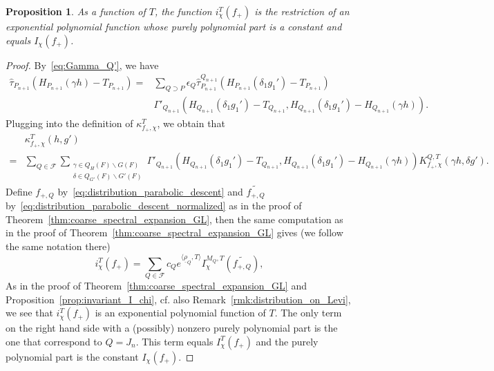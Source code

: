 \documentclass[letterpaper,11pt]{amsart}
\newcommand{\cF}{\mathcal{F}}
\newcommand{\<}{\negthickspace}
\theoremstyle{definition}
\theoremstyle{plain}
\newtheorem{prop}[definition]{Proposition}
\theoremstyle{remark}
\numberwithin{equation}{section}
\begin{document}
\begin{prop}    \label{prop:modified_kernel_second}
As a function of $T$, the function $i_{\chi}^T(f_+)$ is the restriction of
an exponential polynomial function whose purely polynomial part is a constant
and equals $I_\chi(f_+)$.
\end{prop}

\begin{proof}
By~\eqref{eq:Gamma_Q'}, we have
    \begin{align*}
     \widehat{\tau}_{P_{n+1}}(H_{P_{n+1}}(\gamma h)-T_{P_{n+1}})
     = &\sum_{Q \supset P} \epsilon_Q \widehat{\tau}_{P_{n+1}}^{Q_{n+1}}
     ( H_{P_{n+1}}(\delta_1 g_1')-T_{P_{n+1}} )\\
     &\Gamma'_{Q_{n+1}} ( H_{Q_{n+1}}(\delta_1 g_1')-T_{Q_{n+1}},
     H_{Q_{n+1}}(\delta_1 g_1') - H_{Q_{n+1}}(\gamma h) ).
    \end{align*}
Plugging into the definition of $\kappa_{f_+, \chi}^T$, we obtain that
    \[
    \begin{aligned}
    &\kappa_{f_+,\chi}^T(h,g')\\ = &\sum_{Q \in \cF}
    \sum_{ \substack{\gamma \in Q_H(F) \backslash G(F) \\
    \delta \in Q_{G'}(F) \backslash G'(F)}}
    \Gamma'_{Q_{n+1}}(H_{Q_{n+1}}(\delta_1 g_1')-T_{Q_{n+1}},
    H_{Q_{n+1}}(\delta_1 g_1')-H_{Q_{n+1}}(\gamma h))
    K_{f_+,\chi}^{Q,T}(\gamma h,\delta g').
    \end{aligned}
    \]
Define $f_{+, Q}$ by~\eqref{eq:distribution_parabolic_descent} and
$\widetilde{f_{+, Q}}$
by~\eqref{eq:distribution_parabolic_descent_normalized} as in the proof of
Theorem~\ref{thm:coarse_spectral_expansion_GL}, then the same computation as
in the proof of Theorem~\ref{thm:coarse_spectral_expansion_GL} gives (we
follow the same notation there)
    \[
    i_\chi^T(f_+) = \sum_{Q \in \cF}
    c_Q e^{\langle \underline{\rho}_Q, T \rangle}
    I_\chi^{M_Q,T}(\widetilde{f_{+, Q}}),
    \]
As in the proof of Theorem~\ref{thm:coarse_spectral_expansion_GL} and
Proposition~\ref{prop:invariant_I_chi}, cf. also
Remark~\ref{rmk:distribution_on_Levi},
we see that $i_\chi^T(f_+)$ is an
exponential polynomial function of $T$. The only term on the right hand side
with a (possibly) nonzero purely polynomial part is the one that correspond
to $Q = J_n$. This term equals $I_{\chi}^T(f_+)$ and
the purely polynomial part is the constant $I_{\chi}(f_+)$.
\end{proof}
\end{document}
